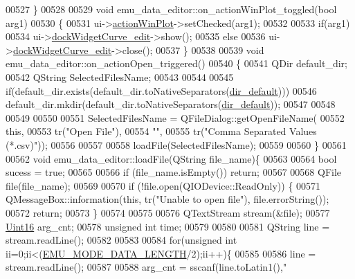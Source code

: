 \begin{DoxyCode}
00527 \}
00528 
00529 \textcolor{keywordtype}{void} emu\_data\_editor::on\_actionWinPlot\_toggled(\textcolor{keywordtype}{bool} arg1)
00530 \{
00531      ui->\hyperlink{a00079_a0aeb289d8df9db6f4329e9000e44d511}{actionWinPlot}->setChecked(arg1);
00532 
00533      \textcolor{keywordflow}{if}(arg1)
00534          ui->\hyperlink{a00079_a83360bdd61e994537715aa7c38e4e5b6}{dockWidgetCurve\_edit}->show();
00535      \textcolor{keywordflow}{else}
00536          ui->\hyperlink{a00079_a83360bdd61e994537715aa7c38e4e5b6}{dockWidgetCurve\_edit}->close();
00537 \}
00538 
00539 \textcolor{keywordtype}{void} emu\_data\_editor::on\_actionOpen\_triggered()
00540 \{
00541     QDir   default\_dir;
00542     QString SelectedFilesName;
00543 
00544 
00545     \textcolor{keywordflow}{if}(default\_dir.exists(default\_dir.toNativeSeparators(\hyperlink{a00008_aa55b7d8008e31fcc971692b493e7cf34}{dir\_default})))
00546         default\_dir.mkdir(default\_dir.toNativeSeparators(\hyperlink{a00008_aa55b7d8008e31fcc971692b493e7cf34}{dir\_default}));
00547 
00548 
00549 
00550 
00551     SelectedFilesName = QFileDialog::getOpenFileName(
00552         \textcolor{keyword}{this},
00553         tr(\textcolor{stringliteral}{"Open File"}),
00554         \textcolor{stringliteral}{""},
00555         tr(\textcolor{stringliteral}{"Comma Separated Values (*.csv)"}));
00556 
00557 
00558      loadFile(SelectedFilesName);
00559 
00560 \}
00561 
00562 \textcolor{keywordtype}{void} emu\_data\_editor::loadFile(QString file\_name)\{
00563 
00564     \textcolor{keywordtype}{bool}   sucess = \textcolor{keyword}{true};
00565 
00566     \textcolor{keywordflow}{if} (file\_name.isEmpty()) \textcolor{keywordflow}{return};
00567 
00568         QFile file(file\_name);
00569 
00570         \textcolor{keywordflow}{if} (!file.open(QIODevice::ReadOnly)) \{
00571             QMessageBox::information(\textcolor{keyword}{this}, tr(\textcolor{stringliteral}{"Unable to open file"}), file.errorString());
00572             \textcolor{keywordflow}{return};
00573         \}
00574 
00575 
00576 QTextStream stream(&file);
00577 \hyperlink{a00004_aae7407b021d43f7193a81a58cfb3e297}{Uint16} arg\_cnt;
00578 \textcolor{keywordtype}{unsigned} \textcolor{keywordtype}{int} time;
00579 
00580 
00581        QString line = stream.readLine();
00582 
00583 
00584        \textcolor{keywordflow}{for}(\textcolor{keywordtype}{unsigned} \textcolor{keywordtype}{int} ii=0;ii<(\hyperlink{a00006_af4c3a8ad94feb4d7bda7f107f34baf41}{EMU\_MODE\_DATA\_LENGTH}/2);ii++)\{
00585 
00586              line = stream.readLine();
00587 
00588              arg\_cnt = sscanf(line.toLatin1(),\textcolor{stringliteral}{"%
}
\end{DoxyCode}
